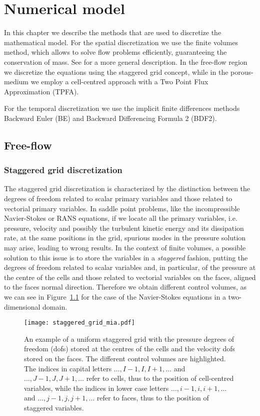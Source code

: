 \chapter{Numerical model} \label{chap:discretization} %
In this chapter we describe the methods that are used to discretize the mathematical model. 
For the spatial discretization we use the finite volumes method, which allows 
to solve flow problems efficiently, guaranteeing the conservation of mass. See 
\cite{fv:leveque} for a more general description.
In the free-flow region we discretize the equations using the staggered grid 
concept, while in the porous-medium we employ a cell-centred approach with a 
Two Point Flux Approximation (TPFA).

For the temporal discretization we use the implicit finite differences methods 
Backward Euler (BE) and Backward Differencing Formula 2 (BDF2).
%
\section{Free-flow}
\subsection{Staggered grid discretization}
The staggered grid discretization is characterized by the distinction between 
the degrees of freedom related to scalar primary variables and those related to 
vectorial primary variables. In saddle point problems, like the incompressible 
Navier-Stokes or RANS equations, if we locate all the primary variables, i.e. 
pressure, velocity and possibly the turbulent kinetic energy and its 
dissipation rate, at the same positions in the grid, spurious modes in the 
pressure solution may arise, leading to wrong results. In the context of finite 
volumes, a possible solution to 
this issue 
is to store the variables in a \emph{staggered} fashion, putting 
the degrees of freedom related to scalar variables and, in particular, of the 
pressure at the centre of the cells 
and those related to vectorial variables on the faces, aligned to the faces 
normal direction. Therefore we obtain different control volumes, as we can see 
in Figure~\ref{fig:staggrid} for the case of the 
Navier-Stokes equations in a two-dimensional domain.
\begin{figure}[t]
	\centering
	\texttt{[image: staggered\_grid\_mia.pdf]}
	\caption[Staggered grid control volumes]{An example of a uniform staggered 
	grid with the pressure degrees of freedom (dofs) stored at the centres of 
	the cells and the velocity dofs stored on the faces. The different control 
	volumes are highlighted. The indices in capital letters $\dots, I-1, I, 
	I+1, \dots$ and $\dots, J-1, J, J+1, \dots$ refer to cells, thus to the 
	position of cell-centred variables, while the indices in lower case letters 
	$\dots, i-1, i, i+1, \dots$ and $\dots,j-1,j,j+1,\dots$ refer to faces, 
	thus to the position of staggered variables.}
	\label{fig:staggrid}
\end{figure}

